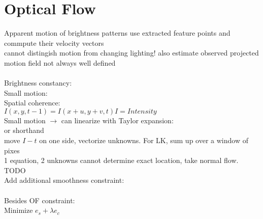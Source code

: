 \section{Optical Flow}
Apparent motion of brightness patterns use extracted feature points and commpute their velocity vectors \\
 cannot distingish motion from changing lighting! also estimate observed projected motion field  not always well defined \\
 \\
Brightness constancy: \\
Small motion: \\
Spatial coherence: \\
 $I(x, y, t - 1) = I(x + u, y + v, t) I = Intensity$\\
Small motion $\rightarrow$ can linearize with Taylor expansion:\\
 or shorthand \\
move $I-t$ on one side, vectorize unknowns. For LK, sum up over a window of pixes\\
 1 equation, 2 unknowns cannot determine exact location, take normal flow. TODO\\
Add additional smoothness constraint: \\
\\
Besides OF constraint: \\
 Minimize $e_s + \lambda e_c$
